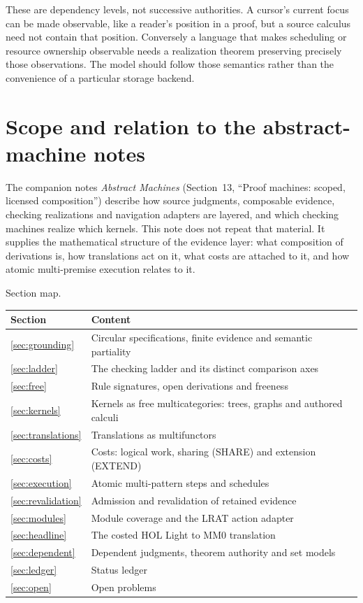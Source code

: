 \documentclass[11pt,a4paper]{article}
\theoremstyle{plain}
\theoremstyle{definition}
\theoremstyle{remark}
\begin{document}
These are dependency levels, not successive authorities. A cursor's current
focus can be made observable, like a reader's position in a proof, but a
source calculus need not contain that position. Conversely a language that
makes scheduling or resource ownership observable needs a realization theorem
preserving precisely those observations. The model should follow those
semantics rather than the convenience of a particular storage backend.

\section{Scope and relation to the abstract-machine notes}\label{sec:scope}

The companion notes \emph{Abstract Machines} (Section~13, ``Proof machines:
scoped, licensed composition'') describe how source judgments, composable
evidence, checking realizations and navigation adapters are layered, and which
checking machines realize which kernels. This note does not repeat that
material. It supplies the mathematical structure of the evidence layer: what
composition of derivations is, how translations act on it, what costs are
attached to it, and how atomic multi-premise execution relates to it.

Section map.
\begin{center}\small
\begin{tabularx}{\linewidth}{lX}
\toprule
Section & Content \\
\midrule
\ref{sec:grounding} & Circular specifications, finite evidence and semantic partiality \\
\ref{sec:ladder} & The checking ladder and its distinct comparison axes \\
\ref{sec:free} & Rule signatures, open derivations and freeness \\
\ref{sec:kernels} & Kernels as free multicategories: trees, graphs and authored calculi \\
\ref{sec:translations} & Translations as multifunctors \\
\ref{sec:costs} & Costs: logical work, sharing (SHARE) and extension (EXTEND) \\
\ref{sec:execution} & Atomic multi-pattern steps and schedules \\
\ref{sec:revalidation} & Admission and revalidation of retained evidence \\
\ref{sec:modules} & Module coverage and the LRAT action adapter \\
\ref{sec:headline} & The costed HOL Light to MM0 translation \\
\ref{sec:dependent} & Dependent judgments, theorem authority and set models \\
\ref{sec:ledger} & Status ledger \\
\ref{sec:open} & Open problems \\
\bottomrule
\end{tabularx}
\end{center}
\end{document}
